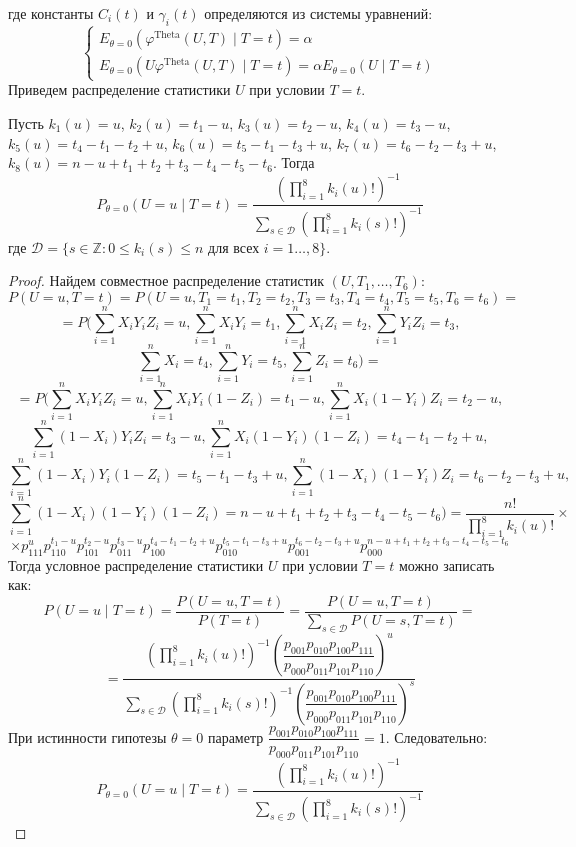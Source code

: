     где константы $C_i(t)$ и $\gamma_i(t)$ определяются из системы уравнений:
    $$
    \begin{cases}
        E_{\theta=0}(\varphi^{\text{Theta}}(U,T) \mid T=t)=\alpha \\
        E_{\theta=0}(U\varphi^{\text{Theta}}(U,T) \mid T=t)=\alpha E_{\theta=0}(U \mid T=t)
    \end{cases}
    $$
    Приведем распределение статистики $U$ при условии $T=t$.      
    \begin{lemma}\label{u_dist}
        Пусть $k_1(u)=u$, $k_2(u)=t_1-u$, $k_3(u)=t_2-u$, $k_4(u)=t_3-u$, $k_5(u)=t_4-t_1-t_2+u$, $k_6(u)=t_5-t_1-t_3+u$,
        $k_7(u)=t_6 - t_2 - t_3 + u$, $k_8(u)=n-u+t_1+t_2+t_3-t_4-t_5-t_6$.
        Тогда
        $$P_{\theta=0}(U=u \mid T=t)=\dfrac{(\prod_{i=1}^8 k_i(u)!)^{-1}}
            {\sum_{s\in \mathcal{D}} (\prod_{i=1}^8 k_i(s)!)^{-1}}$$
        где $\mathcal{D}=\{s \in \mathbb{Z}: 0\leq k_i(s) \leq n \text{ для всех } i=1\ldots,8\}$.
    \end{lemma}
    \begin{proof}
        Найдем совместное распределение статистик $(U,T_1,\ldots,T_6)$:
        $$
            P(U=u,T=t)=P(U=u, T_1=t_1, T_2=t_2, T_3=t_3, T_4=t_4, T_5=t_5, T_6=t_6)=
        $$
        $$
            =P\biggl(\sum_{i=1}^n X_i Y_i Z_i=u, \sum_{i=1}^n X_i Y_i=t_1, \sum_{i=1}^n X_i Z_i=t_2,\sum_{i=1}^n Y_i Z_i=t_3,
            $$
            $$
            \sum_{i=1}^n X_i=t_4,\sum_{i=1}^n Y_i=t_5, \sum_{i=1}^n Z_i=t_6\biggr)=
        $$
        $$
            =P\biggl(\sum_{i=1}^n X_i Y_i Z_i=u, \sum_{i=1}^n X_i Y_i (1- Z_i)=t_1-u, \sum_{i=1}^n X_i (1-Y_i) Z_i=t_2-u,
        $$
        $$
            \sum_{i=1}^n (1-X_i) Y_i Z_i=t_3-u,
            \sum_{i=1}^{n} X_i(1-Y_i)(1-Z_i)=t_4-t_1-t_2+u,
        $$
        $$
            \sum_{i=1}^{n} (1-X_i)Y_i(1-Z_i)=t_5-t_1-t_3+u,
            \sum_{i=1}^{n} (1-X_i)(1-Y_i)Z_i = t_6 - t_2 - t_3 + u,
        $$
        $$
            \sum_{i=1}^n (1-X_i)(1-Y_i)(1-Z_i)=n-u+t_1+t_2+t_3-t_4-t_5-t_6\biggr)
            = \frac{n!}{\prod_{i=1}^8 k_i(u)!} \times
        $$
        $$    
        \times p_{111}^u p_{110}^{t_1-u} p_{101}^{t_2-u} p_{011}^{t_3-u}
            p_{100}^{t_4-t_1-t_2+u} p_{010}^{t_5-t_1-t_3+u} p_{001}^{t_6 - t_2 - t_3 + u} 
            p_{000}^{n-u+t_1+t_2+t_3-t_4-t_5-t_6}
            $$
        Тогда условное распределение статистики $U$ при условии $T=t$ можно записать как:
        $$P(U=u \mid T=t)=\dfrac{P(U=u,T=t)}{P(T=t)}=
        \dfrac{P(U=u,T=t)}{\sum_{s \in \mathcal{D}} P(U=s,T=t)}=
        $$
        $$
        =\dfrac{(\prod_{i=1}^8 k_i(u)!)^{-1} \left(\dfrac{p_{001}p_{010}p_{100}p_{111}}{p_{000}p_{011}p_{101}p_{110}}\right)^u}
            {\sum_{s\in \mathcal{D}} (\prod_{i=1}^8 k_i(s)!)^{-1} \left(\dfrac{p_{001}p_{010}p_{100}p_{111}}{p_{000}p_{011}p_{101}p_{110}}\right)^s}$$
        При истинности гипотезы $\theta=0$ параметр $\dfrac{p_{001}p_{010}p_{100}p_{111}}{p_{000}p_{011}p_{101}p_{110}}=1$. Следовательно:
        $$P_{\theta=0}(U=u \mid T=t)=\dfrac{(\prod_{i=1}^8 k_i(u)!)^{-1}}
            {\sum_{s\in \mathcal{D}} (\prod_{i=1}^8 k_i(s)!)^{-1}}$$
    \end{proof}
